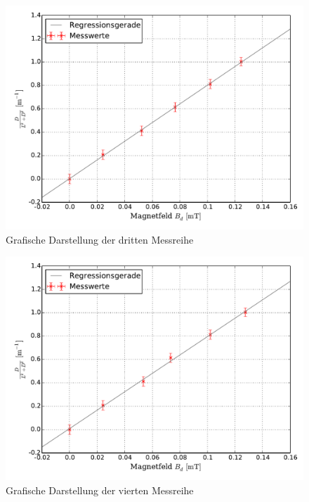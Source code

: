 		\begin{figure}[!h]
				\includegraphics[scale=0.7]{Grafiken/BFeld_Messreihe_III.pdf}
				\caption{Grafische Darstellung der dritten Messreihe}\label{fig:Auswertung_Messdaten_II_III}
		\end{figure}
		\begin{figure}[!h]
				\includegraphics[scale=0.7]{Grafiken/BFeld_Messreihe_IV.pdf}
				\caption{Grafische Darstellung der vierten Messreihe}\label{fig:Auswertung_Messdaten_II_IV}
		\end{figure}
		
		
		
		